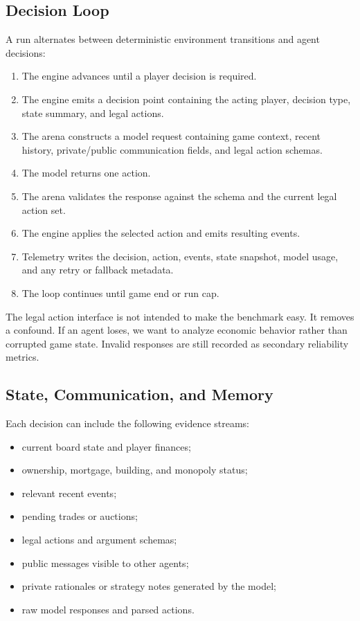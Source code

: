 \documentclass[conference]{IEEEtran}
\begin{document}
\subsection{Decision Loop}

A run alternates between deterministic environment transitions and agent decisions:

\begin{enumerate}
    \item The engine advances until a player decision is required.
    \item The engine emits a decision point containing the acting player, decision type, state summary, and legal actions.
    \item The arena constructs a model request containing game context, recent history, private/public communication fields, and legal action schemas.
    \item The model returns one action.
    \item The arena validates the response against the schema and the current legal action set.
    \item The engine applies the selected action and emits resulting events.
    \item Telemetry writes the decision, action, events, state snapshot, model usage, and any retry or fallback metadata.
    \item The loop continues until game end or run cap.
\end{enumerate}

The legal action interface is not intended to make the benchmark easy. It removes a confound. If an agent loses, we want to analyze economic behavior rather than corrupted game state. Invalid responses are still recorded as secondary reliability metrics.

\subsection{State, Communication, and Memory}

Each decision can include the following evidence streams:

\begin{itemize}
    \item current board state and player finances;
    \item ownership, mortgage, building, and monopoly status;
    \item relevant recent events;
    \item pending trades or auctions;
    \item legal actions and argument schemas;
    \item public messages visible to other agents;
    \item private rationales or strategy notes generated by the model;
    \item raw model responses and parsed actions.
\end{itemize}
\end{document}
